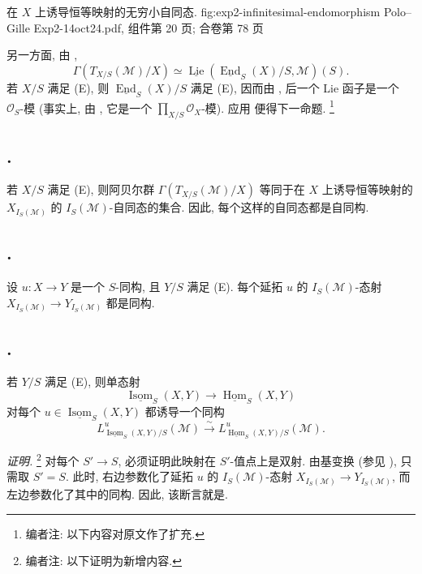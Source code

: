   {在 \(X\) 上诱导恒等映射的无穷小自同态.}
  {fig:exp2-infinitesimal-endomorphism}
  {Polo--Gille Exp2-14oct24.pdf, 组件第 20 页; 合卷第 78 页}

另一方面, 由 ,
\[
  \Gamma(T_{X/S}(\mathcal M)/X)
  \simeq
  \underline{\operatorname{Lie}}
    (\underline{\operatorname{End}}_S(X)/S,\mathcal M)(S).
\]
若 \(X/S\) 满足 (E), 则
\(\underline{\operatorname{End}}_S(X)/S\) 满足 (E),
因而由 ,
后一个 Lie 函子是一个 \(\mathcal O_S\)-模
(事实上, 由 ,
它是一个 \(\prod_{X/S}\mathcal O_X\)-模).
应用  便得下一命题.
\footnote{编者注: 以下内容对原文作了扩充.}

\subsection*{.}
若 \(X/S\) 满足 (E), 则阿贝尔群
\(\Gamma(T_{X/S}(\mathcal M)/X)\) 等同于在 \(X\) 上诱导恒等映射的
\(X_{I_S(\mathcal M)}\) 的 \(I_S(\mathcal M)\)-自同态的集合.
因此, 每个这样的自同态都是自同构.

\subsection*{.}
设 \(u:X\to Y\) 是一个 \(S\)-同构, 且 \(Y/S\) 满足 (E).
每个延拓 \(u\) 的 \(I_S(\mathcal M)\)-态射
\(X_{I_S(\mathcal M)}\to Y_{I_S(\mathcal M)}\) 都是同构.

\subsection*{.}
若 \(Y/S\) 满足 (E), 则单态射
\[
  \underline{\operatorname{Isom}}_S(X,Y)
  \longrightarrow\underline{\operatorname{Hom}}_S(X,Y)
\]
对每个 \(u\in\underline{\operatorname{Isom}}_S(X,Y)\) 都诱导一个同构
\[
  L^u_{\underline{\operatorname{Isom}}_S(X,Y)/S}(\mathcal M)
  \xrightarrow{\sim}
  L^u_{\underline{\operatorname{Hom}}_S(X,Y)/S}(\mathcal M).
\]

\emph{证明.}
\footnote{编者注: 以下证明为新增内容.}
对每个 \(S'\to S\), 必须证明此映射在 \(S'\)-值点上是双射.
由基变换 (参见 ),
只需取 \(S'=S\). 此时, 右边参数化了延拓 \(u\) 的
\(I_S(\mathcal M)\)-态射
\(X_{I_S(\mathcal M)}\to Y_{I_S(\mathcal M)}\),
而左边参数化了其中的同构.
因此, 该断言就是.

